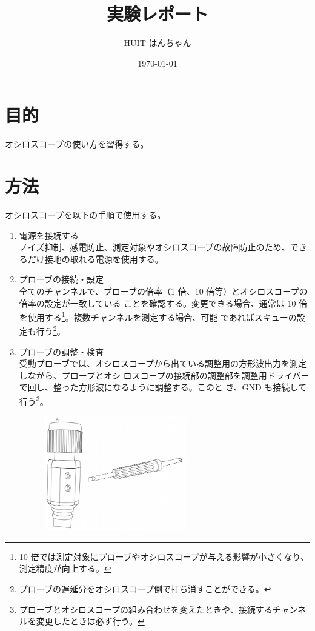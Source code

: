 \documentclass{ltjsarticle}
\title{実験レポート}
\author{HUIT はんちゃん}
\date{\today}
\begin{document}
\maketitle

\section*{目的}
オシロスコープの使い方を習得する。

\section*{方法}

オシロスコープを以下の手順で使用する。

\begin{enumerate}
    \item 電源を接続する\\ノイズ抑制、感電防止、測定対象やオシロスコープの故障防止のため、できるだけ接地の取れる電源を使用する。
    \item プローブの接続・設定\\全てのチャンネルで、プローブの倍率（1 倍、10 倍等）とオシロスコープの倍率の設定が一致している
          ことを確認する。変更できる場合、通常は 10 倍を使用する\footnote{10 倍では測定対象にプローブやオシロスコープが与える影響が小さくなり、測定精度が向上する。}。複数チャンネルを測定する場合、可能
          であればスキューの設定も行う\footnote{プローブの遅延分をオシロスコープ側で打ち消すことができる。}。
    \item プローブの調整・検査\\受動プローブでは、オシロスコープから出ている調整用の方形波出力を測定しながら、プローブとオシ
          ロスコープの接続部の調整部を調整用ドライバーで回し、整った方形波になるように調整する。このと
          き、GND も接続して行う\footnote{ プローブとオシロスコープの組み合わせを変えたときや、接続するチャンネルを変更したときは必ず行う。}。\\
          \begin{figure}[h]
              \centering
              \includegraphics[height=5cm]{prove_calb.png}

\end{figure}
\end{enumerate}
\end{document}
